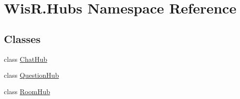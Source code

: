 \hypertarget{namespace_wis_r_1_1_hubs}{}\section{Wis\+R.\+Hubs Namespace Reference}
\label{namespace_wis_r_1_1_hubs}
\subsection*{Classes}
\begin{DoxyCompactItemize}
\item 
class \hyperlink{class_wis_r_1_1_hubs_1_1_chat_hub}{Chat\+Hub}
\item 
class \hyperlink{class_wis_r_1_1_hubs_1_1_question_hub}{Question\+Hub}
\item 
class \hyperlink{class_wis_r_1_1_hubs_1_1_room_hub}{Room\+Hub}
\end{DoxyCompactItemize}
